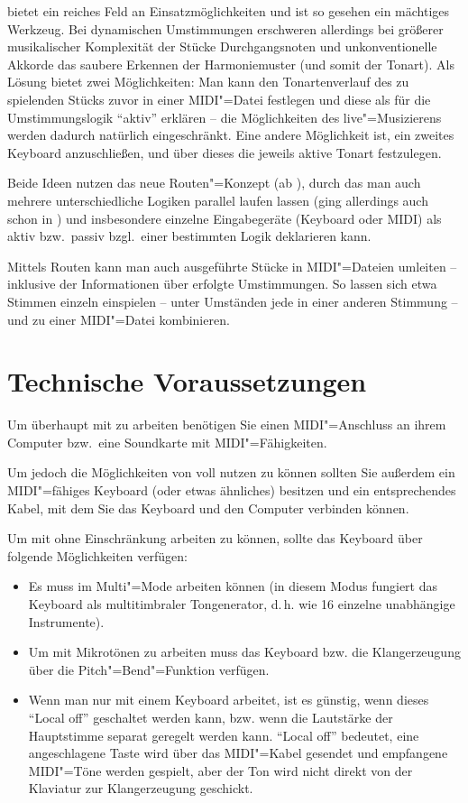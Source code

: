 \mutabor{} bietet ein reiches Feld an Einsatzmöglichkeiten und ist so
gesehen ein mächtiges Werkzeug. Bei dynamischen Umstimmungen
erschweren allerdings bei größerer musikalischer Komplexität der
Stücke Durchgangsnoten und unkonventionelle Akkorde das saubere
Erkennen der Harmoniemuster (und somit der Tonart). Als Lösung bietet
\mutabor{} zwei Möglichkeiten: Man kann den Tonartenverlauf des zu
spielenden Stücks zuvor in einer MIDI"=Datei festlegen und diese als
für die Umstimmungslogik "`aktiv"' erklären -- die Möglichkeiten des
live"=Musizierens werden dadurch natürlich eingeschränkt. Eine andere
Möglichkeit ist, ein zweites Keyboard anzuschließen, und über dieses
die jeweils aktive Tonart festzulegen.


Beide Ideen nutzen das neue Routen"=Konzept (ab \mutabor[~3]), 
durch das man auch mehrere unterschiedliche Logiken parallel 
laufen lassen (ging allerdings auch schon in \mutabor[~II]) 
und insbesondere einzelne Eingabegeräte (Keyboard oder MIDI) 
als aktiv bzw.\ passiv bzgl.\ einer bestimmten Logik deklarieren 
kann. 

Mittels Routen kann man auch ausgeführte Stücke in MIDI"=Dateien
umleiten -- inklusive der Informationen über erfolgte Umstimmungen.
So lassen sich etwa Stimmen einzeln einspielen -- unter Umständen jede
in einer anderen Stimmung -- und zu einer MIDI"=Datei kombinieren.


\section{Technische Voraussetzungen}

Um überhaupt mit \mutabor{} zu arbeiten benötigen Sie einen
MIDI"=Anschluss an ihrem Computer bzw.\ eine Soundkarte mit
MIDI"=Fähigkeiten.

Um jedoch die Möglichkeiten von \mutabor{} voll nutzen zu 
können sollten Sie außerdem ein MIDI"=fähiges Keyboard (oder 
etwas ähnliches) besitzen und ein entsprechendes Kabel, mit 
dem Sie das Keyboard und den Computer verbinden können.

Um mit \mutabor{} ohne Einschränkung arbeiten zu können, 
sollte das Keyboard über folgende Möglichkeiten verfügen:

\begin{itemize}
\item Es muss im Multi"=Mode arbeiten können (in diesem Modus fungiert
  das Keyboard als multitimbraler Tongenerator, d.\,h. wie 16 einzelne
  unabhängige Instrumente).
\item Um mit Mikrotönen zu arbeiten muss das Keyboard bzw. die
  Klangerzeugung über die Pitch"=Bend"=Funktion verfügen.
\item Wenn man nur mit einem Keyboard arbeitet, ist es günstig, wenn
  dieses "`Local off"' geschaltet werden kann, bzw. wenn die
  Lautstärke der Hauptstimme separat geregelt werden kann. "`Local
  off"' bedeutet, eine angeschlagene Taste wird über das MIDI"=Kabel
  gesendet und empfangene MIDI"=Töne werden gespielt, aber der Ton
  wird nicht direkt von der Klaviatur zur Klangerzeugung geschickt.
\end{itemize}

